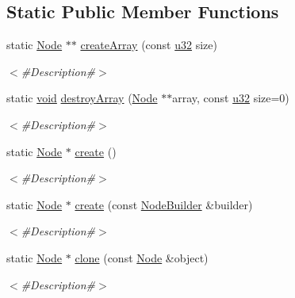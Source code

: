 \subsection*{Static Public Member Functions}
\begin{DoxyCompactItemize}
\item 
static \mbox{\hyperlink{classnjli_1_1_node}{Node}} $\ast$$\ast$ \mbox{\hyperlink{classnjli_1_1_node_a84cb417cae539076d9ee123c8d59a7bf}{create\+Array}} (const \mbox{\hyperlink{_util_8h_a10e94b422ef0c20dcdec20d31a1f5049}{u32}} size)
\begin{DoxyCompactList}\small\item\em $<$\#\+Description\#$>$ \end{DoxyCompactList}\item 
static \mbox{\hyperlink{_thread_8h_af1e856da2e658414cb2456cb6f7ebc66}{void}} \mbox{\hyperlink{classnjli_1_1_node_ae9cb5171f3a98dc90911758e9d5baec4}{destroy\+Array}} (\mbox{\hyperlink{classnjli_1_1_node}{Node}} $\ast$$\ast$array, const \mbox{\hyperlink{_util_8h_a10e94b422ef0c20dcdec20d31a1f5049}{u32}} size=0)
\begin{DoxyCompactList}\small\item\em $<$\#\+Description\#$>$ \end{DoxyCompactList}\item 
static \mbox{\hyperlink{classnjli_1_1_node}{Node}} $\ast$ \mbox{\hyperlink{classnjli_1_1_node_a955a287409afef586899ff05e4340fc7}{create}} ()
\begin{DoxyCompactList}\small\item\em $<$\#\+Description\#$>$ \end{DoxyCompactList}\item 
static \mbox{\hyperlink{classnjli_1_1_node}{Node}} $\ast$ \mbox{\hyperlink{classnjli_1_1_node_a55a31dd7ce89a76fe6620b3deb984bbb}{create}} (const \mbox{\hyperlink{classnjli_1_1_node_builder}{Node\+Builder}} \&builder)
\begin{DoxyCompactList}\small\item\em $<$\#\+Description\#$>$ \end{DoxyCompactList}\item 
static \mbox{\hyperlink{classnjli_1_1_node}{Node}} $\ast$ \mbox{\hyperlink{classnjli_1_1_node_acb3d3885f7798ef44a1636a290acae51}{clone}} (const \mbox{\hyperlink{classnjli_1_1_node}{Node}} \&object)
\begin{DoxyCompactList}\small\item\em $<$\#\+Description\#$>$ \end{DoxyCompactList}\item 

\end{DoxyCompactItemize}
